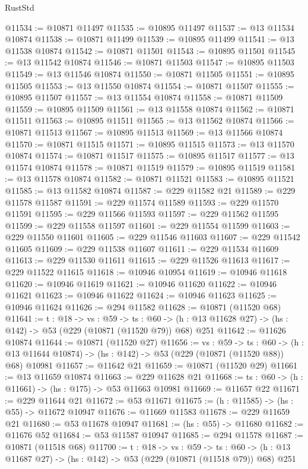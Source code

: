 \begin{lexlean}{RustStd}
\begin{coremodule}
@11534 := @10871 @11497
@11535 := @10895 @11497
@11537 := @13 @11534 @10874
@11538 := @10871 @11499
@11539 := @10895 @11499
@11541 := @13 @11538 @10874
@11542 := @10871 @11501
@11543 := @10895 @11501
@11545 := @13 @11542 @10874
@11546 := @10871 @11503
@11547 := @10895 @11503
@11549 := @13 @11546 @10874
@11550 := @10871 @11505
@11551 := @10895 @11505
@11553 := @13 @11550 @10874
@11554 := @10871 @11507
@11555 := @10895 @11507
@11557 := @13 @11554 @10874
@11558 := @10871 @11509
@11559 := @10895 @11509
@11561 := @13 @11558 @10874
@11562 := @10871 @11511
@11563 := @10895 @11511
@11565 := @13 @11562 @10874
@11566 := @10871 @11513
@11567 := @10895 @11513
@11569 := @13 @11566 @10874
@11570 := @10871 @11515
@11571 := @10895 @11515
@11573 := @13 @11570 @10874
@11574 := @10871 @11517
@11575 := @10895 @11517
@11577 := @13 @11574 @10874
@11578 := @10871 @11519
@11579 := @10895 @11519
@11581 := @13 @11578 @10874
@11582 := @10871 @11521
@11583 := @10895 @11521
@11585 := @13 @11582 @10874
@11587 := @229 @11582 @21
@11589 := @229 @11578 @11587
@11591 := @229 @11574 @11589
@11593 := @229 @11570 @11591
@11595 := @229 @11566 @11593
@11597 := @229 @11562 @11595
@11599 := @229 @11558 @11597
@11601 := @229 @11554 @11599
@11603 := @229 @11550 @11601
@11605 := @229 @11546 @11603
@11607 := @229 @11542 @11605
@11609 := @229 @11538 @11607
@11611 := @229 @11534 @11609
@11613 := @229 @11530 @11611
@11615 := @229 @11526 @11613
@11617 := @229 @11522 @11615
@11618 := @10946 @10954
@11619 := @10946 @11618
@11620 := @10946 @11619
@11621 := @10946 @11620
@11622 := @10946 @11621
@11623 := @10946 @11622
@11624 := @10946 @11623
@11625 := @10946 @11624
@11626 := @294 @11582
@11628 := @10871 (@11520 @68)
@11641 := {t : @18} ->
  {vs : @59} ->
  {ts : @60} -> (h : @13 @11628 @27) -> (hs : @142) -> @53 (@229 (@10871 (@11520 @79)) @68) @251
@11642 := @11626 @10874
@11644 := @10871 (@11520 @27)
@11656 := {vs : @59} ->
  {ts : @60} ->
  (h : @13 @11644 @10874) -> (hs : @142) -> @53 (@229 (@10871 (@11520 @88)) @68) @10981
@11657 := @11642 @21
@11659 := @10871 (@11520 @29)
@11661 := @13 @11659 @10874
@11663 := @229 @11628 @21
@11668 := {ts : @60} -> (h : @11661) -> (hs : @175) -> @53 @11663 @10981
@11669 := @11657 @22
@11671 := @229 @11644 @21
@11672 := @53 @11671
@11675 := (h : @11585) -> (hs : @55) -> @11672 @10947
@11676 := @11669 @11583
@11678 := @229 @11659 @21
@11680 := @53 @11678 @10947
@11681 := (hs : @55) -> @11680
@11682 := @11676 @52
@11684 := @53 @11587 @10947
@11685 := @294 @11578
@11687 := @10871 (@11518 @68)
@11700 := {t : @18} ->
  {vs : @59} ->
  {ts : @60} -> (h : @13 @11687 @27) -> (hs : @142) -> @53 (@229 (@10871 (@11518 @79)) @68) @251

\end{coremodule}
\end{lexlean}
